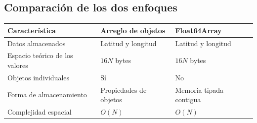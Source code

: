 \documentclass[11pt,a4paper]{article}
\begin{document}
\subsection*{Comparación de los dos enfoques}

\renewcommand{\arraystretch}{1.3}
\begin{center}
\begin{tabular}{|p{4.6cm}|p{4.2cm}|p{4.2cm}|}
  \hline
  \textbf{Característica} & \textbf{Arreglo de objetos} & \textbf{Float64Array} \\
  \hline
  Datos almacenados & Latitud y longitud & Latitud y longitud \\
  \hline
  Espacio teórico de los valores & $16N$ bytes & $16N$ bytes \\
  \hline
  Objetos individuales & Sí & No \\
  \hline
  Forma de almacenamiento & Propiedades de objetos & Memoria tipada contigua \\
  \hline
  Complejidad espacial & $O(N)$ & $O(N)$ \\
  \hline
\end{tabular}
\end{center}
\end{document}
